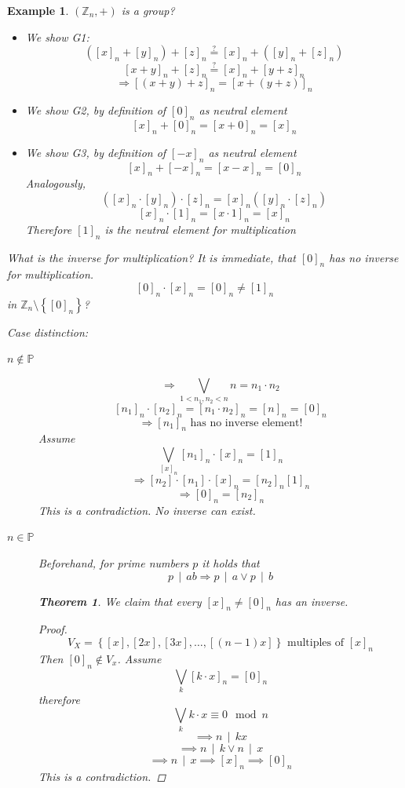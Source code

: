 \documentclass[a4paper,landscape,twocolumn]{article}
\newcommand\set[1]{\left\{#1\right\}}
\newcommand\divides[2]{#1\,\mid\,#2}
\newtheorem{theorem}{Theorem}[section]
\newtheorem{ex}{Example}[section]
\begin{document}
\begin{ex}
  $(\mathbb{Z}_n, +)$ is a group?
  \begin{itemize}
    \item We show G1:
      \[ \left([x]_n + [y]_n\right) + [z]_n \stackrel?= [x]_n + \left([y]_n + [z]_n\right) \]
      \[ [x+y]_n + [z]_n \stackrel?= [x]_n + \left[y + z\right]_n \]
      \[ \Rightarrow \left[(x + y) + z\right]_n = \left[x + (y + z)\right]_n \]
    \item We show G2, by definition of $[0]_n$ as neutral element
      \[ [x]_n + [0]_n = [x + 0]_n = [x]_n \]
    \item We show G3, by definition of $[-x]_n$ as neutral element
      \[ [x]_n + [-x]_n = [x - x]_n = [0]_n \]
      Analogously,
      \[ \left([x]_n \cdot [y]_n\right) \cdot [z]_n = [x]_n \left([y]_n \cdot [z]_n\right) \]
      \[ [x]_n \cdot [1]_n = [x \cdot 1]_n = [x]_n \]
      Therefore $[1]_n$ is the neutral element for multiplication
  \end{itemize}

  What is the inverse for multiplication?
  It is immediate, that $[0]_n$ has no inverse for multiplication.
  \[ [0]_n \cdot [x]_n = [0]_n \neq [1]_n \]
  in $\mathbb{Z}_n\setminus \set{[0]_n}$?

  Case distinction:
  \begin{description}
    \item[$n \not\in \mathbb{P}$]
      \[ \Rightarrow \bigvee_{1 < n_1, n_2 < n} n = n_1 \cdot n_2 \]
      \[ [n_1]_n \cdot [n_2]_n = [n_1 \cdot n_2]_n = [n]_n = [0]_n \]
      \[ \Rightarrow [n_1]_n \text{ has no inverse element!} \]
      Assume
      \[ \bigvee_{[x]_n} [n_1]_n \cdot [x]_n = [1]_n \]
      \[ \Rightarrow [n_2] \cdot [n_1] \cdot [x]_n = [n_2]_n [1]_n \]
      \[ \Rightarrow [0]_n = [n_2]_n \]
      This is a contradiction. No inverse can exist.
    \item[$n \in \mathbb{P}$]
      Beforehand, for prime numbers $p$ it holds that
      \[ \divides{p}{ab} \Rightarrow \divides{p}{a} \lor \divides{p}{b} \]

      \begin{theorem}
        We claim that every $[x]_n \neq [0]_n$ has an inverse.
      \end{theorem}
      \begin{proof}
        \[ V_X = \set{[x], [2x], [3x], \ldots, [(n-1) x]} \text{ multiples of } [x]_n \]
        Then $[0]_n \not\in V_x$. Assume
        \[ \bigvee_k [k\cdot x]_n = [0]_n \]
        therefore
        \[ \bigvee_k k \cdot x \equiv 0 \mod{n} \]
        \[ \implies \divides{n}{kx} \]
        \[ \implies \divides{n}{k} \lor \divides{n}{x} \]
        \[ \implies \divides{n}{x} \implies [x]_n \implies [0]_n \]
        This is a contradiction.
      \end{proof}


\end{description}
\end{ex}
\end{document}
